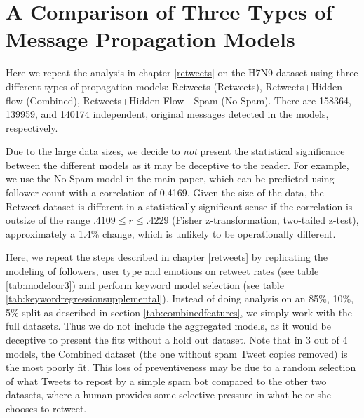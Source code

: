 \chapter{A Comparison of Three Types of Message Propagation Models}
\label{appendix:comparetypes}
Here we repeat the analysis in chapter \ref{retweets} on the H7N9 dataset using three different types of propagation models: Retweets (Retweets), Retweets+Hidden flow (Combined), Retweets+Hidden Flow - Spam (No Spam). There are 158364, 139959, and 140174 independent, original messages detected in the models, respectively. 


Due to the large data sizes, we decide to \emph{not} present the statistical significance between the different models as it may be deceptive to the reader. For example, we use the No Spam model in the main paper, which can be predicted using follower count with a correlation of 0.4169. Given the size of the data, the Retweet dataset is different in a statistically significant sense if the correlation is outsize of the range \(.4109 \leq r \leq .4229\) (Fisher z-transformation, two-tailed z-test), approximately a 1.4\% change, which is unlikely to be operationally different.

Here, we repeat the steps described in chapter \ref{retweets} by replicating the modeling of followers, user type and emotions on retweet rates (see table \ref{tab:modelcor3}) and perform keyword model selection (see table \ref{tab:keywordregressionsupplemental}). Instead of doing analysis on an 85\%, 10\%, 5\% split as described in section \ref{tab:combinedfeatures}, we simply work with the full datasets. Thus we do not include the aggregated models, as it would be deceptive to present the fits without a hold out dataset. Note that in 3 out of 4 models, the Combined dataset (the one without spam Tweet copies removed) is the most poorly fit. This loss of preventiveness may be due to a random selection of what Tweets to repost by a simple spam bot compared to the other two datasets, where a human provides some selective pressure in what he or she chooses to retweet.


